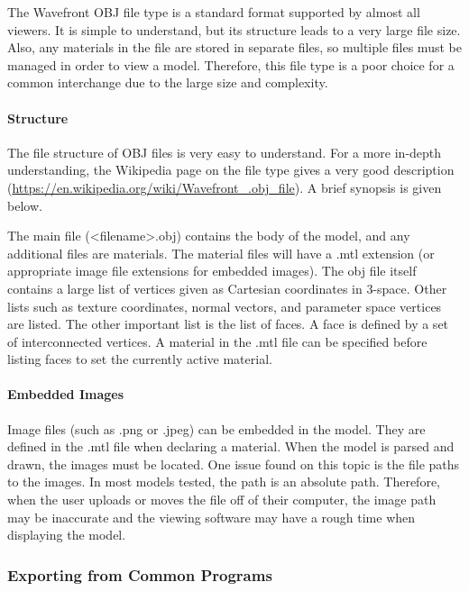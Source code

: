             The Wavefront OBJ file type is a standard format supported by almost all viewers.  It is simple to understand, but its structure leads to a very large file size.  Also, any materials in the file are stored in separate files, so multiple files must be managed in order to view a model.  Therefore, this file type is a poor choice for a common interchange due to the large size and complexity.

            \paragraph{Structure}

                The file structure of OBJ files is very easy to understand.  For a more in-depth understanding, the Wikipedia page on the file type gives a very good description (\url{https://en.wikipedia.org/wiki/Wavefront_.obj_file}).  A brief synopsis is given below.

                The main file (<filename>.obj) contains the body of the model, and any additional files are materials.  The material files will have a .mtl extension (or appropriate image file extensions for embedded images).  The obj file itself contains a large list of vertices given as Cartesian coordinates in 3-space.  Other lists such as texture coordinates, normal vectors, and parameter space vertices are listed.  The other important list is the list of faces.  A face is defined by a set of interconnected vertices.  A material in the .mtl file can be specified before listing faces to set the currently active material.

            \paragraph{Embedded Images}

                Image files (such as .png or .jpeg) can be embedded in the model.  They are defined in the .mtl file when declaring a material.  When the model is parsed and drawn, the images must be located.  One issue found on this topic is the file paths to the images.  In most models tested, the path is an absolute path.  Therefore, when the user uploads or moves the file off of their computer, the image path may be inaccurate and the viewing software may have a rough time when displaying the model.

        \subsubsection{Exporting from Common Programs}

